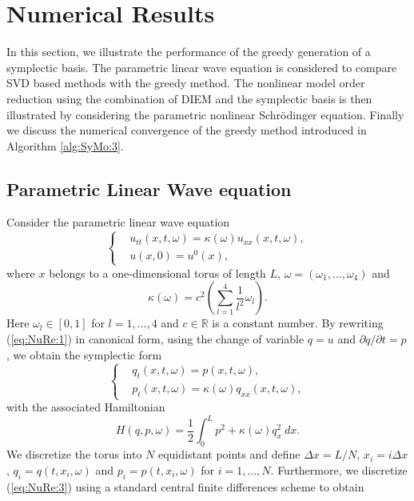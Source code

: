 \documentclass[final]{siamart}
\begin{document}
\section{Numerical Results} \label{chap:NuRe:1}
In this section, we illustrate the performance of the greedy generation of a symplectic basis. The parametric linear wave equation is considered to compare SVD based methods with the greedy method. The nonlinear model order reduction using the combination of DIEM and the symplectic basis is then illustrated by considering the parametric nonlinear Schr\"odinger equation. {{\color{black}} Finally we discuss the numerical convergence of the greedy method introduced in Algorithm \ref{alg:SyMo:3}.}

\subsection{Parametric Linear Wave equation} \label{chap:NuRe:1.1} Consider the {{\color{black}} parametric} linear wave equation
\begin{equation} \label{eq:NuRe:1}
\left\{
\begin{aligned}
& u_{tt}(x,t,\omega) = \kappa(\omega) u_{xx}(x,t,\omega), \\
& u(x,0) = u^0(x),
\end{aligned}
\right.
\end{equation}
where $x$ belongs to a one-dimensional torus of length $L$, $\omega = (\omega_1,\dots,\omega_4)$ and
\begin{equation} \label{eq:NuRe:2}
	\kappa(\omega) = c^2\left( \sum_{l=1}^4 \frac{1}{l^2} \omega_l \right).
\end{equation}
{{\color{black}} Here $\omega_l \in [0,1]$ for $l=1,\dots,4$} and $c\in \mathbb{R}$ is a constant number. By rewriting (\ref{eq:NuRe:1}) in canonical form, using the change of variable $q = u$ and $\partial q/ \partial t= p$, we obtain the symplectic form
\begin{equation} \label{eq:NuRe:3}
\left\{
\begin{aligned}
& q_t(x,t,\omega) = p(x,t,\omega), \\
& p_t(x,t,\omega) = \kappa(\omega) q_{xx}(x,t,\omega),
\end{aligned}
\right.
\end{equation}
with the associated Hamiltonian
\begin{equation} \label{eq:NuRe:4}
	H(q,p,\omega) = \frac 1 2 \int_0^L p^2 + \kappa(\omega) q_x^2 \ dx.
\end{equation}
We discretize the torus into $N$ equidistant points and define $\Delta x = L/N$, $x_i = i\Delta x$, $q_i=q(t,x_i,\omega)$ and $p_i=p(t,x_i,\omega)$ for $i = 1, \dots, N$. Furthermore, we discretize (\ref{eq:NuRe:3}) using a standard central finite differences scheme to obtain
\end{document}
